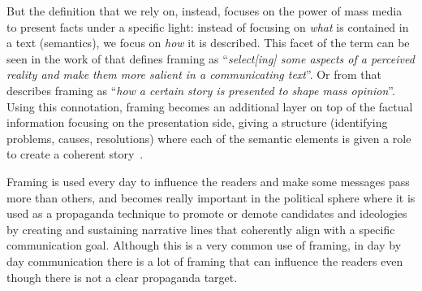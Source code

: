 But the definition that we rely on, instead, focuses on the power of mass media to present facts under a specific light: instead of focusing on \emph{what} is contained in a text (semantics), we focus on \emph{how} it is described.
This facet of the term can be seen in the work of
\citet{entman1993framing} that defines framing as ``\textit{select[ing] some aspects of a perceived reality and make them more salient in a communicating text}''.
Or from \citet{goffman1974frame} that describes framing as ``\textit{how a certain story is presented to shape mass opinion}''.
Using this connotation, framing becomes an additional layer on top of the factual information focusing on the presentation side, giving a structure (identifying problems, causes, resolutions) where each of the semantic elements is given a role to create a coherent story~\cite{pan1993framing}.

Framing is used every day to influence the readers and make some messages pass more than others, and becomes really important in the political sphere where it is used as a propaganda technique to promote or demote candidates and ideologies by creating and sustaining narrative lines that coherently align with a specific communication goal.
Although this is a very common use of framing, in day by day communication there is a lot of framing that can influence the readers even though there is not a clear propaganda target.



